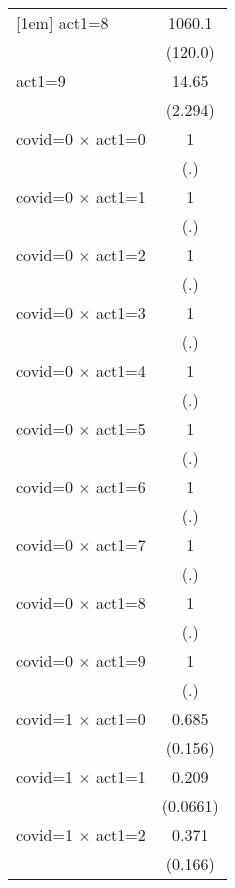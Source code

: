 {\begin{tabular}{l*{1}{c}}
[1em]
act1=8              &      1060.1\sym{***}\\
                    &     (120.0)         \\
[1em]
act1=9              &       14.65\sym{***}\\
                    &     (2.294)         \\
[1em]
covid=0 $\times$ act1=0&           1         \\
                    &         (.)         \\
[1em]
covid=0 $\times$ act1=1&           1         \\
                    &         (.)         \\
[1em]
covid=0 $\times$ act1=2&           1         \\
                    &         (.)         \\
[1em]
covid=0 $\times$ act1=3&           1         \\
                    &         (.)         \\
[1em]
covid=0 $\times$ act1=4&           1         \\
                    &         (.)         \\
[1em]
covid=0 $\times$ act1=5&           1         \\
                    &         (.)         \\
[1em]
covid=0 $\times$ act1=6&           1         \\
                    &         (.)         \\
[1em]
covid=0 $\times$ act1=7&           1         \\
                    &         (.)         \\
[1em]
covid=0 $\times$ act1=8&           1         \\
                    &         (.)         \\
[1em]
covid=0 $\times$ act1=9&           1         \\
                    &         (.)         \\
[1em]
covid=1 $\times$ act1=0&       0.685         \\
                    &     (0.156)         \\
[1em]
covid=1 $\times$ act1=1&       0.209\sym{***}\\
                    &    (0.0661)         \\
[1em]
covid=1 $\times$ act1=2&       0.371\sym{*}  \\
                    &     (0.166)         \\

\end{tabular}}
